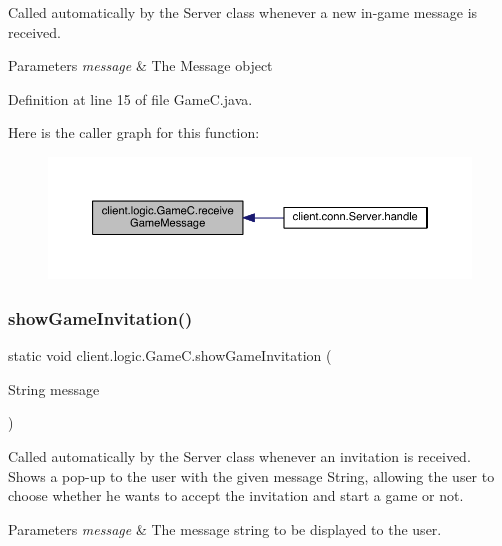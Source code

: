 Called automatically by the {\ttfamily Server} class whenever a new in-\/game message is received.


\begin{DoxyParams}{Parameters}
{\em message} & The Message object \\
\hline
\end{DoxyParams}


Definition at line 15 of file Game\+C.\+java.

Here is the caller graph for this function\+:
\nopagebreak
\begin{figure}[H]
\begin{center}
\leavevmode
\includegraphics[width=350pt]{classclient_1_1logic_1_1_game_c_a70979b2783537bb175c0a8926680e236_icgraph}
\end{center}
\end{figure}
\hypertarget{classclient_1_1logic_1_1_game_c_a62c530e593e489903a8ab6557763be27}{}\label{classclient_1_1logic_1_1_game_c_a62c530e593e489903a8ab6557763be27} 
\subsubsection{\texorpdfstring{show\+Game\+Invitation()}{showGameInvitation()}}
{\footnotesize\ttfamily static void client.\+logic.\+Game\+C.\+show\+Game\+Invitation (\begin{DoxyParamCaption}\item[{String}]{message }\end{DoxyParamCaption})\hspace{0.3cm}{\ttfamily [static]}}

Called automatically by the {\ttfamily Server} class whenever an invitation is received. Shows a pop-\/up to the user with the given message String, allowing the user to choose whether he wants to accept the invitation and start a game or not.


\begin{DoxyParams}{Parameters}
{\em message} & The message string to be displayed to the user. \\
\hline
\end{DoxyParams}


